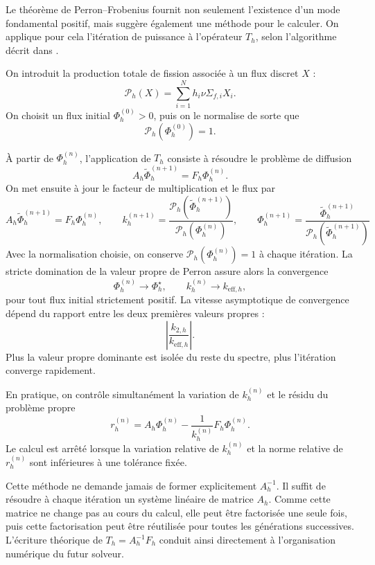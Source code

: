\documentclass{article}
\begin{document}
Le théorème de Perron--Frobenius fournit non seulement l'existence d'un mode fondamental positif, mais suggère également une méthode pour le calculer. On applique pour cela l'itération de puissance à l'opérateur $T_h$, selon l'algorithme décrit dans \cite[chap.~6, section~6.6.3]{Allaire2018}.

On introduit la production totale de fission associée à un flux discret
$X$ :
\[
    \mathcal P_h(X)
    =
    \sum_{i=1}^{N}
    h_i\nu\Sigma_{f,i}X_i.
\]
On choisit un flux initial $\Phi_h^{(0)}>0$, puis on le normalise de
sorte que
\[
    \mathcal P_h\!\left(\Phi_h^{(0)}\right)=1.
\]

À partir de $\Phi_h^{(n)}$, l'application de $T_h$ consiste à résoudre
le problème de diffusion
\[
    A_h\widetilde{\Phi}_h^{(n+1)}
    =
    F_h\Phi_h^{(n)}.
\]
On met ensuite à jour le facteur de multiplication et le flux par
\begin{equation}
    \boxed{
        A_h\widetilde{\Phi}_h^{(n+1)} = F_h\Phi_h^{(n)}, 
        \qquad
        k_h^{(n+1)} = \frac{\mathcal P_h\!\left( \widetilde{\Phi}_h^{(n+1)} \right)}
        {\mathcal P_h\!\left(\Phi_h^{(n)}\right)},
        \qquad
        \Phi_h^{(n+1)} = \frac{ \widetilde{\Phi}_h^{(n+1)}}
        {\mathcal P_h\!\left(\widetilde{\Phi}_h^{(n+1)}\right)}
    }
    \label{eq:iteration-puissance-diffusion}
\end{equation}
Avec la normalisation choisie, on conserve $\mathcal P_h\!\left(\Phi_h^{(n)}\right)=1$ à chaque itération.
La stricte domination de la valeur propre de Perron assure alors la convergence
\[
    \Phi_h^{(n)} \longrightarrow \Phi_h^\star,
    \qquad
    k_h^{(n)} \longrightarrow k_{\mathrm{eff},h},
\]
pour tout flux initial strictement positif. La vitesse asymptotique de convergence dépend du rapport entre les deux premières valeurs propres :
\[
\left| \frac{k_{2,h}}{k_{\mathrm{eff},h}} \right|.
\]
Plus la valeur propre dominante est isolée du reste du spectre, plus l'itération converge rapidement.

En pratique, on contrôle simultanément la variation de $k_h^{(n)}$ et le résidu du problème propre
\begin{equation}
    r_h^{(n)} = A_h\Phi_h^{(n)} - \frac{1}{k_h^{(n)}}F_h\Phi_h^{(n)}.
    \label{eq:residu-criticite}
\end{equation}
Le calcul est arrêté lorsque la variation relative de $k_h^{(n)}$ et la norme relative de $r_h^{(n)}$ sont inférieures à une tolérance fixée.

Cette méthode ne demande jamais de former explicitement $A_h^{-1}$. Il suffit de résoudre à chaque itération un système linéaire de matrice $A_h$. Comme cette matrice ne change pas au cours du calcul,
elle peut être factorisée une seule fois, puis cette factorisation peut être réutilisée pour toutes les générations successives. L'écriture théorique de $T_h=A_h^{-1}F_h$ conduit ainsi directement à l'organisation numérique du futur solveur.
\end{document}
